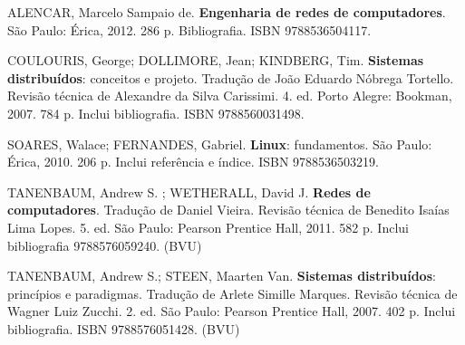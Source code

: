 \begin{pud}
\begin{bibcomplementar}
		\item ALENCAR, Marcelo Sampaio de. \textbf{Engenharia de redes de computadores}. São Paulo: Érica, 2012. 286 p. Bibliografia. ISBN 9788536504117.
		\item COULOURIS, George; DOLLIMORE, Jean; KINDBERG, Tim. \textbf{Sistemas distribuídos}: conceitos e projeto. Tradução de João Eduardo Nóbrega Tortello. Revisão técnica de Alexandre da Silva Carissimi. 4. ed. Porto Alegre: Bookman, 2007. 784 p. Inclui bibliografia. ISBN 9788560031498.
		\item SOARES, Walace; FERNANDES, Gabriel. \textbf{Linux}: fundamentos. São Paulo: Érica, 2010. 206 p. Inclui referência e índice. ISBN 9788536503219.
		\item TANENBAUM, Andrew S. ; WETHERALL, David J. \textbf{Redes de computadores}. Tradução de Daniel Vieira. Revisão técnica de Benedito Isaías Lima Lopes. 5. ed. São Paulo: Pearson Prentice Hall, 2011. 582 p. Inclui bibliografia 9788576059240. (BVU)
		\item TANENBAUM, Andrew S.; STEEN, Maarten Van. \textbf{Sistemas distribuídos}: princípios e paradigmas. Tradução de Arlete Simille Marques. Revisão técnica de Wagner Luiz Zucchi. 2. ed. São Paulo: Pearson Prentice Hall, 2007. 402 p. Inclui bibliografia. ISBN 9788576051428. (BVU)
		
	\end{bibcomplementar}
	
	
	
\end{pud}




